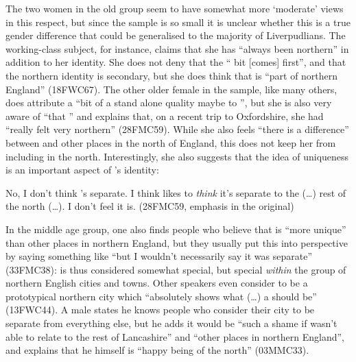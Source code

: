The two women in the old group seem to have somewhat more `moderate' views in this respect, but since the sample is so small it is unclear whether this is a true gender difference that could be generalised to the majority of Liverpudlians.
The working-class subject, for instance, claims that she has ``always been northern'' in addition to her  identity.
She does not deny that the `` bit [comes] first'', and that the northern identity is secondary, but she does think that  is ``part of northern England'' (18FWC67).
The other older female in the sample, like many others, does attribute a ``bit of a stand alone quality maybe to '', but she is also very aware of ``that '' and explains that, on a recent trip to Oxfordshire, she had ``really felt very northern'' (28FMC59).
While she also feels ``there is a difference'' between  and other places in the north of England, this does not keep her from including  in the north.
Interestingly, she also suggests that the idea of uniqueness is an important aspect of 's identity:
\begin{example}
	No, I don't think 's separate. I think  likes to \emph{think} it's separate to the (\ldots) rest of the north (\ldots). I don't feel it is. (28FMC59, emphasis in the original)
\end{example}

In the middle age group, one also finds people who believe that  is ``more unique'' than other places in northern England, but they usually put this into perspective by saying something like ``but I wouldn't necessarily say it was separate'' (33FMC38):  is thus considered somewhat special, but special \emph{within} the group of northern English cities and towns.
Other speakers even consider  to be a prototypical northern city which ``absolutely shows what (\ldots) a  should be'' (13FWC44).
A male  states he knows people who consider their city to be separate from everything else, but he adds it would be ``such a shame if  wasn't able to relate to the rest of Lancashire'' and ``other places in northern England'', and explains that he himself is ``happy being of the north'' (03MMC33).

